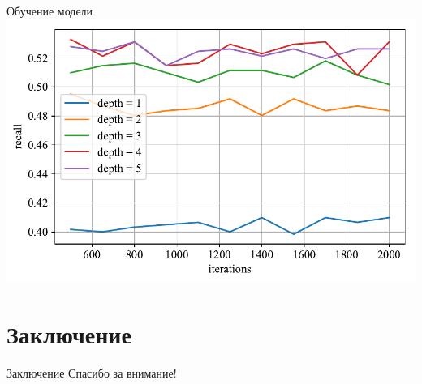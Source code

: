 \documentclass{beamer}
\begin{document}
\begin{frame}{Обучение модели}
    \includegraphics[width=\textwidth]{../images/toloka_catboost_recall.pdf}
\end{frame}

\section{Заключение}

\begin{frame}{Заключение}
    Спасибо за внимание!
\end{frame}
\end{document}
